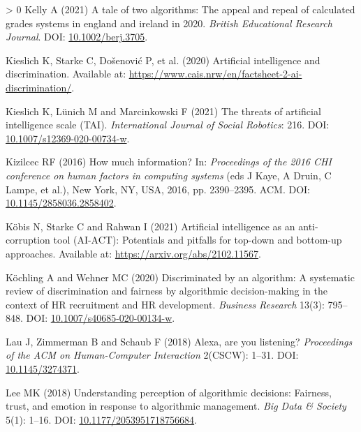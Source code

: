 \documentclass{article}
\newlength{\cslhangindent}
\newenvironment{CSLReferences}[3] %
 {%
  \setlength{\parindent}{0pt}
  \ifodd #1 \everypar{\setlength{\hangindent}{\cslhangindent}}\ignorespaces\fi
  \ifnum #2 > 0
  \setlength{\parskip}{#2\baselineskip}
  \fi
 }%
 {}
\begin{document}
\begin{CSLReferences}{1}{0}
\leavevmode\hypertarget{ref-Kelly.2021}{}%
Kelly A (2021) A tale of two algorithms: The appeal and repeal of
calculated grades systems in england and ireland in 2020. \emph{British
Educational Research Journal}. DOI:
\href{https://doi.org/10.1002/berj.3705}{10.1002/berj.3705}.

\leavevmode\hypertarget{ref-Kieslich.2020}{}%
Kieslich K, Starke C, Došenović P, et al. (2020) Artificial intelligence
and discrimination. Available at:
\url{https://www.cais.nrw/en/factsheet-2-ai-discrimination/}.

\leavevmode\hypertarget{ref-Kieslich.2021}{}%
Kieslich K, Lünich M and Marcinkowski F (2021) The threats of artificial
intelligence scale (TAI). \emph{International Journal of Social
Robotics}: 216. DOI:
\href{https://doi.org/10.1007/s12369-020-00734-w}{10.1007/s12369-020-00734-w}.

\leavevmode\hypertarget{ref-Kizilcec.2016}{}%
Kizilcec RF (2016) How much information? In: \emph{Proceedings of the
2016 CHI conference on human factors in computing systems} (eds J Kaye,
A Druin, C Lampe, et al.), New York, NY, USA, 2016, pp. 2390--2395. ACM.
DOI:
\href{https://doi.org/10.1145/2858036.2858402}{10.1145/2858036.2858402}.

\leavevmode\hypertarget{ref-Kobis.2021}{}%
Köbis N, Starke C and Rahwan I (2021) Artificial intelligence as an
anti-corruption tool (AI-ACT): Potentials and pitfalls for top-down and
bottom-up approaches. Available at:
\url{https://arxiv.org/abs/2102.11567}.

\leavevmode\hypertarget{ref-Kochling.2020}{}%
Köchling A and Wehner MC (2020) Discriminated by an algorithm: A
systematic review of discrimination and fairness by algorithmic
decision-making in the context of HR recruitment and HR development.
\emph{Business Research} 13(3): 795--848. DOI:
\href{https://doi.org/10.1007/s40685-020-00134-w}{10.1007/s40685-020-00134-w}.

\leavevmode\hypertarget{ref-Lau.2018}{}%
Lau J, Zimmerman B and Schaub F (2018) Alexa, are you listening?
\emph{Proceedings of the ACM on Human-Computer Interaction} 2(CSCW):
1--31. DOI: \href{https://doi.org/10.1145/3274371}{10.1145/3274371}.

\leavevmode\hypertarget{ref-Lee.2018}{}%
Lee MK (2018) Understanding perception of algorithmic decisions:
Fairness, trust, and emotion in response to algorithmic management.
\emph{Big Data {\&} Society} 5(1): 1--16. DOI:
\href{https://doi.org/10.1177/2053951718756684}{10.1177/2053951718756684}.


\end{CSLReferences}
\end{document}
